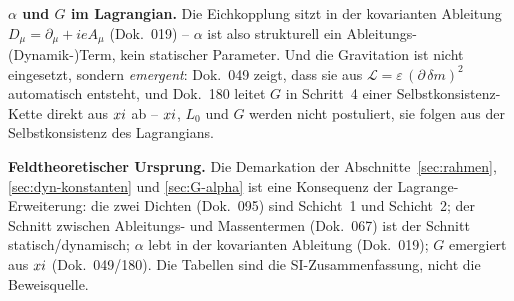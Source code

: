 \textbf{$\alpha$ und $G$ im Lagrangian.} Die Eichkopplung sitzt in der kovarianten
Ableitung $D_\mu = \partial_\mu + ieA_\mu$ (Dok.~019) -- $\alpha$ ist also
strukturell ein Ableitungs-(Dynamik-)Term, kein statischer Parameter. Und die
Gravitation ist nicht eingesetzt, sondern \emph{emergent}: Dok.~049 zeigt, dass sie
aus $\mathcal{L} = \varepsilon\,(\partial\,\delta m)^2$ automatisch entsteht, und
Dok.~180 leitet $G$ in Schritt~4 einer Selbstkonsistenz-Kette direkt aus $xi$
ab -- $xi$, $L_0$ und $G$ werden nicht postuliert, sie folgen aus der
Selbstkonsistenz des Lagrangians.

\begin{result}
\textbf{Feldtheoretischer Ursprung.} Die Demarkation der
Abschnitte~\ref{sec:rahmen}, \ref{sec:dyn-konstanten} und \ref{sec:G-alpha} ist
eine Konsequenz der Lagrange-Erweiterung: die zwei Dichten (Dok.~095) sind
Schicht~1 und Schicht~2; der Schnitt zwischen Ableitungs- und Massentermen
(Dok.~067) ist der Schnitt statisch/dynamisch; $\alpha$ lebt in der kovarianten
Ableitung (Dok.~019); $G$ emergiert aus $xi$ (Dok.~049/180). Die Tabellen sind
die SI-Zusammenfassung, nicht die Beweisquelle.
\end{result}
